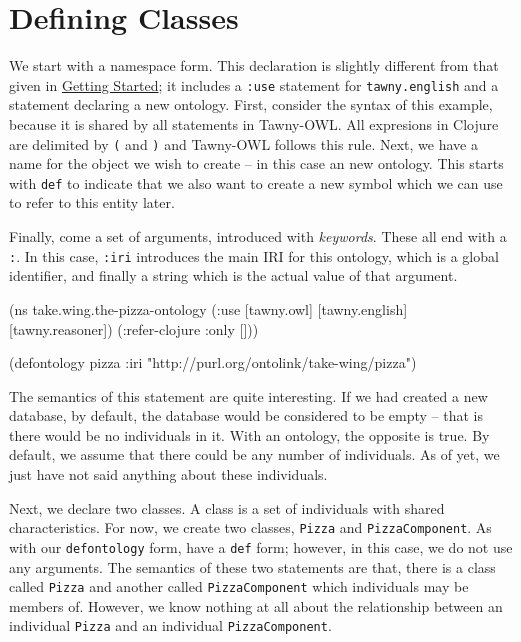 \section{Defining Classes}
\label{sec-5-2}

We start with a namespace form. This declaration is slightly different from
that given in \hyperref[sec-4]{Getting Started}; it includes a \verb~:use~
statement for \verb~tawny.english~ and a statement declaring a new ontology.
First, consider the syntax of this example, because it is shared by all
statements in Tawny-OWL. All expresions in Clojure are delimited by \verb~(~
and \verb~)~ and Tawny-OWL follows this rule. Next, we have a name for the
object we wish to create -- in this case an new ontology. This starts with
\verb~def~ to indicate that we also want to create a new symbol which we can
use to refer to this entity later.

Finally, come a set of arguments, introduced with \emph{keywords}. These all
end with a \verb~:~. In this case, \verb~:iri~ introduces the main IRI for this
ontology, which is a global identifier, and finally a string which is
the actual value of that argument.

\begin{tawny}
(ns take.wing.the-pizza-ontology
  (:use [tawny.owl]
	[tawny.english]
        [tawny.reasoner])
  (:refer-clojure :only []))

(defontology pizza :iri "http://purl.org/ontolink/take-wing/pizza")
\end{tawny}


The semantics of this statement are quite interesting. If we had created
a new database, by default, the database would be considered to be empty
-- that is there would be no individuals in it. With an ontology, the
opposite is true. By default, we assume that there could be any number
of individuals. As of yet, we just have not said anything about these
individuals.

Next, we declare two classes. A class is a set of individuals with
shared characteristics. For now, we create two classes, \verb~Pizza~ and
\verb~PizzaComponent~. As with our \verb~defontology~ form, have a \verb~def~ form;
however, in this case, we do not use any arguments. The semantics of
these two statements are that, there is a class called \verb~Pizza~ and
another called \verb~PizzaComponent~ which individuals may be members of.
However, we know nothing at all about the relationship between an
individual \verb~Pizza~ and an individual \verb~PizzaComponent~.


